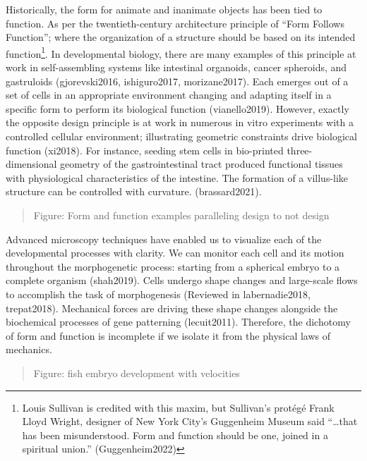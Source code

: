\documentclass[
]{article}
\begin{document}
Historically, the form for animate and inanimate objects has been tied
to function. As per the twentieth-century architecture principle of
``Form Follows Function''; where the organization of a structure should
be based on its intended function\footnote{Louis Sullivan is credited
  with this maxim, but Sullivan's protégé Frank Lloyd Wright, designer
  of New York City's Guggenheim Museum said ``\ldots that has been
  misunderstood. Form and function should be one, joined in a spiritual
  union.'' (Guggenheim2022)}. In developmental biology, there are many
examples of this principle at work in self-assembling systems like
intestinal organoids, cancer spheroids, and gastruloids (gjorevski2016,
ishiguro2017, morizane2017). Each emerges out of a set of cells in an
appropriate environment changing and adapting itself in a specific form
to perform its biological function (vianello2019). However, exactly the
opposite design principle is at work in numerous in vitro experiments
with a controlled cellular environment; illustrating geometric
constraints drive biological function (xi2018). For instance, seeding
stem cells in bio-printed three-dimensional geometry of the
gastrointestinal tract produced functional tissues with physiological
characteristics of the intestine. The formation of a villus-like
structure can be controlled with curvature. (brassard2021).

\begin{quote}
Figure: Form and function examples paralleling design to not design
\end{quote}

Advanced microscopy techniques have enabled us to visualize each of the
developmental processes with clarity. We can monitor each cell and its
motion throughout the morphogenetic process: starting from a spherical
embryo to a complete organism (shah2019). Cells undergo shape changes
and large-scale flows to accomplish the task of morphogenesis (Reviewed
in labernadie2018, trepat2018). Mechanical forces are driving these
shape changes alongside the biochemical processes of gene patterning
(lecuit2011). Therefore, the dichotomy of form and function is
incomplete if we isolate it from the physical laws of mechanics.

\begin{quote}
Figure: fish embryo development with velocities
\end{quote}
\end{document}
